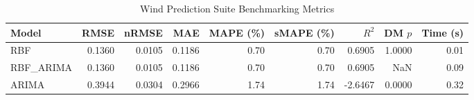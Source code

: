 \begin{table}[htbp]
\centering
\caption{Wind Prediction Suite Benchmarking Metrics}
\label{tab:wind_prediction_summary}
\begin{tabular}{lrrrrrrrr}
\toprule
Model & RMSE & nRMSE & MAE & MAPE (\%) & sMAPE (\%) & $R^2$ & DM $p$ & Time (s) \\
\midrule
RBF & 0.1360 & 0.0105 & 0.1186 & 0.70 & 0.70 & 0.6905 & 1.0000 & 0.01 \\
RBF_ARIMA & 0.1360 & 0.0105 & 0.1186 & 0.70 & 0.70 & 0.6905 & NaN & 0.09 \\
ARIMA & 0.3944 & 0.0304 & 0.2966 & 1.74 & 1.74 & -2.6467 & 0.0000 & 0.32 \\
\bottomrule
\end{tabular}
\end{table}

